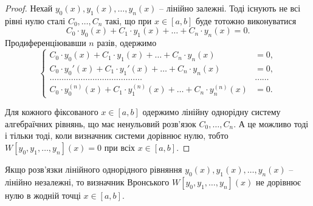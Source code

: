 \begin{proof}
	Нехай $y_0(x), y_1(x), \ldots, y_n(x)$ -- лінійно залежні. Тоді існують не всі рівні нулю сталі $C_0, \ldots, C_n$ такі, що при $x \in [a,b]$ буде тотожно виконуватися
	\begin{equation*}
		C_0 \cdot y_0(x) + C_1 \cdot y_1(x) + \ldots + C_n \cdot y_n(x) = 0.
	\end{equation*}
	Продиференціювавши $n$ разів, одержимо 
	\begin{equation*}
		\left\{ \begin{aligned}
			C_0 \cdot y_0(x) + C_1 \cdot y_1(x) + \ldots + C_n \cdot y_n(x) &= 0, \\
			C_0 \cdot y_0'(x) + C_1 \cdot y_1'(x) + \ldots + C_n \cdot y_n(x) &= 0, \\
			\ldots \ldots \ldots \ldots \ldots \ldots \ldots \ldots \ldots \ldots \ldots \ldots \ldots & \ldots \ldots \\
			C_0 \cdot y_0^{(n)}(x) + C_1 \cdot y_1^{(n)}(x) + \ldots + C_n \cdot y_n^{(n)}(x) &= 0.
		\end{aligned} \right.
	\end{equation*}
 
	Для кожного фіксованого $x \in [a,b]$ одержимо лінійну однорідну систему алгебраїчних рівнянь, що має ненульовий розв'язок $C_0, \ldots, C_n$. А це можливо тоді і тільки тоді, коли визначник системи дорівнює нулю, тобто $W[y_0, y_1, \ldots, y_n](x) = 0$ при всіх $x \in [a,b]$.
\end{proof}

\begin{theorem}
	Якщо розв'язки лінійного однорідного рівняння $y_0(x), y_1(x), \ldots, y_n(x)$ -- лінійно незалежні, то визначник Вронського $W[y_0, y_1, \ldots, y_n](x)$ не дорівнює нулю в жодній точці $x \in [a,b]$.
\end{theorem} 

